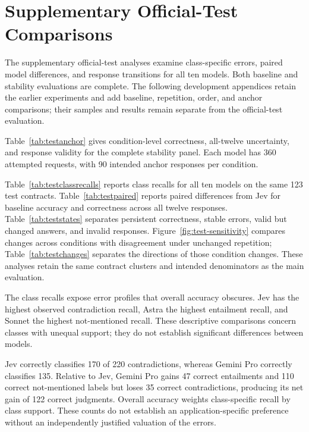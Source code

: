 \documentclass{article}
\begin{document}


\clearpage
\appendix
\suppressfloats[t]
\makeatletter
\setlength{\@dblfptop}{0pt}
\setlength{\@dblfpsep}{18pt}
\setlength{\@dblfpbot}{0pt plus 1fil}
\makeatother

\section{Supplementary Official-Test Comparisons}
\label{app:testdetails}
The supplementary official-test analyses examine class-specific errors, paired model differences, and response transitions for all ten models. Both baseline and stability evaluations are complete. The following development appendices retain the earlier experiments and add baseline, repetition, order, and anchor comparisons; their samples and results remain separate from the official-test evaluation.

Table~\ref{tab:testanchor} gives condition-level correctness, all-twelve uncertainty, and response validity for the complete stability panel. Each model has 360 attempted requests, with 90 intended anchor responses per condition.


Table~\ref{tab:testclassrecalls} reports class recalls for all ten models on the same 123 test contracts. Table~\ref{tab:testpaired} reports paired differences from Jev for baseline accuracy and correctness across all twelve responses. Table~\ref{tab:teststates} separates persistent correctness, stable errors, valid but changed answers, and invalid responses. Figure~\ref{fig:test-sensitivity} compares changes across conditions with disagreement under unchanged repetition; Table~\ref{tab:testchanges} separates the directions of those condition changes. These analyses retain the same contract clusters and intended denominators as the main evaluation.

The class recalls expose error profiles that overall accuracy obscures. Jev has the highest observed contradiction recall, Astra the highest entailment recall, and Sonnet the highest not-mentioned recall. These descriptive comparisons concern classes with unequal support; they do not establish significant differences between models.

Jev correctly classifies 170 of 220 contradictions, whereas Gemini Pro correctly classifies 135. Relative to Jev, Gemini Pro gains 47 correct entailments and 110 correct not-mentioned labels but loses 35 correct contradictions, producing its net gain of 122 correct judgments. Overall accuracy weights class-specific recall by class support. These counts do not establish an application-specific preference without an independently justified valuation of the errors.
\end{document}
